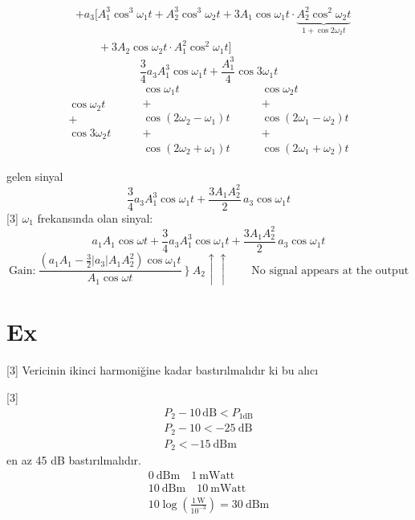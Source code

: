 \documentclass[11pt,a4paper]{article}
\begin{document}
\begin{align*}
&+a_3\Big[A_1^3\cos^3\omega_1 t + A_2^3\cos^3\omega_2 t + 3A_1\cos\omega_1 t\cdot\underbrace{A_2^2\cos^2\omega_2 t}_{1+\cos 2\omega_2 t}\\
&\qquad + 3A_2\cos\omega_2 t\cdot A_1^2\cos^2\omega_1 t\Big]
\end{align*}
\[ \frac{3}{4}a_3A_1^3\cos\omega_1 t + \frac{A_1^3}{4}\cos 3\omega_1 t \]
\[
\begin{array}{c}\cos\omega_2 t\\ +\\ \cos 3\omega_2 t\end{array}
\qquad
\begin{array}{c}\cos\omega_1 t\\ +\\ \cos(2\omega_2-\omega_1)t\\ +\\ \cos(2\omega_2+\omega_1)t\end{array}
\qquad
\begin{array}{c}\cos\omega_2 t\\ +\\ \cos(2\omega_1-\omega_2)t\\ +\\ \cos(2\omega_1+\omega_2)t\end{array}
\]

gelen sinyal
\[ \frac{3}{4}a_3A_1^3\cos\omega_1 t + \frac{3A_1A_2^2}{2}\,a_3\cos\omega_1 t \]
[3]
$\omega_1$ frekansında olan sinyal:
\[ a_1A_1\cos\omega t + \frac{3}{4}a_3A_1^3\cos\omega_1 t + \frac{3A_1A_2^2}{2}\,a_3\cos\omega_1 t \]
\[ \text{Gain:}\ \frac{\left(a_1A_1-\frac{3}{2}|a_3|A_1A_2^2\right)\cos\omega_1 t}{A_1\cos\omega t}\ \Big\}\ A_2\!\uparrow\!\uparrow \qquad \text{No signal appears at the output} \]

\section{Ex}
[3]
Vericinin ikinci harmoniğine kadar bastırılmalıdır ki bu alıcı 

[3]
\begin{gather*}
P_2-10\,\mathrm{dB} < P_{1\mathrm{dB}}\\
P_2-10 < -25\ \mathrm{dB}\\
P_2 < -15\ \mathrm{dBm}
\end{gather*}
en az 45 dB bastırılmalıdır.
\begin{gather*}
0\ \mathrm{dBm}\quad 1\ \mathrm{mWatt}\\
10\ \mathrm{dBm}\quad 10\ \mathrm{mWatt}\\
10\log\left(\frac{1\,\mathrm{W}}{10^{-3}}\right) = 30\ \mathrm{dBm}
\end{gather*}
\end{document}
